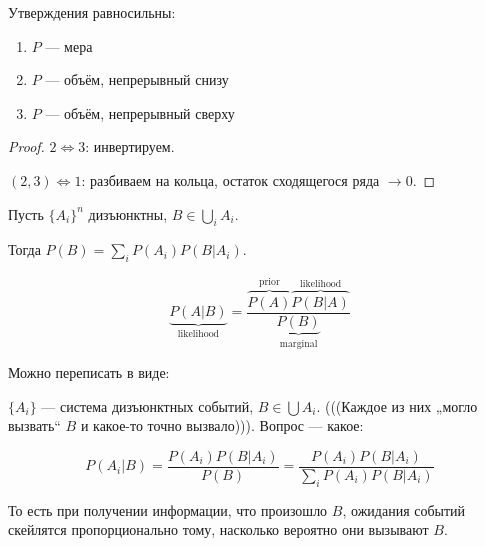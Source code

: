 \documentclass[12pt, a4paper, oneside]{memoir}
\begin{document}

\begin{theorem}
    Утверждения равносильны:

    \begin{enumerate}
        \item $P$ — мера
        \item $P$ — объём, непрерывный снизу
        \item $P$ — объём, непрерывный сверху
    \end{enumerate}
\end{theorem}

\begin{proof}
    $2 \Leftrightarrow 3$: инвертируем.

    $(2, 3) \Leftrightarrow 1$: разбиваем на кольца, остаток сходящегося ряда $→ 0$. 
\end{proof}

\begin{theorem}

    Пусть $\{A_i\}^n$ дизъюнктны, $B \in \bigcup_i A_i$.

    Тогда $P(B) = \sum_i P(A_i)P(B | A_i)$.
\end{theorem}



\begin{theorem}
    [Байеса]

    \begin{equation}
        \underbrace{P(A | B)}_{\mathrm{likelihood}} = \frac{\overbrace{P(A)}^{\mathrm{prior}} \overbrace{P(B | A)}^{\mathrm{likelihood}}}{\underbrace{P(B)}_{\mathrm{marginal}}}
    \end{equation}
\end{theorem}

Можно переписать в виде:

$\{A_i\}$ — система дизъюнктных событий, $B \in \bigcup A_i$.
(((Каждое из них „могло вызвать“ $B$ и какое-то точно вызвало))).
Вопрос — какое:

\begin{equation}
    P(A_i | B) = \frac{P(A_i)P(B | A_i)}{P(B)} = \frac{P(A_i)P(B | A_i)}{\sum_i P(A_i)P(B | A_i)}
\end{equation}

То есть при получении информации, что произошло $B$, ожидания событий скейлятся пропорционально тому,
насколько вероятно они вызывают $B$.
\end{document}
